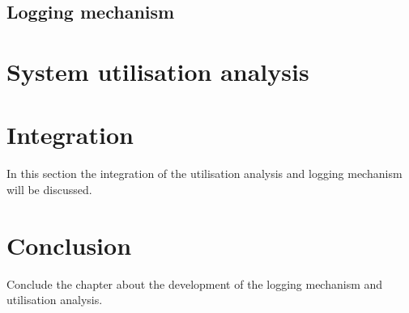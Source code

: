 \subsection{Logging mechanism}

\section{System utilisation analysis}

\section{Integration}
In this section the integration of the utilisation analysis and logging mechanism will be discussed.

\section{Conclusion}
Conclude the chapter about the development of the logging mechanism and utilisation analysis.